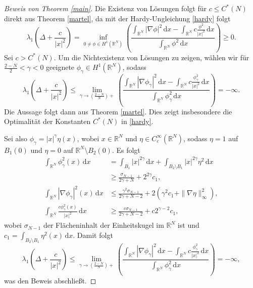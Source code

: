 \documentclass[11pt,twoside,a4paper]{article}
\theoremstyle{break}
\begin{document}
\begin{proof}[Beweis von Theorem \ref{main}]
Die Existenz von Lösungen folgt für $c\le C^*(N)$ direkt aus Theorem \ref{martel}, da mit der Hardy-Ungleichung \eqref{hardy} folgt
\begin{equation}
\lambda_1(\Delta + \frac{c}{|x|^2})= \inf_{0\neq \phi \in H^1(\mathbb R^N)} \left ( \frac{\int_{\mathbb R^N} |\nabla \phi|^2 \, \mathrm dx - \int_{\mathbb R^N} c \frac{\phi^2}{|x|^2}\, \mathrm dx}{\int_{\mathbb R^N}\phi^2\, \mathrm dx} \right )\ge 0.
\end{equation}
Sei $c>C^*(N)$. Um die Nichtexistenz von Lösungen zu zeigen, wählen wir für $\frac{2-N}{2}<\gamma <0$ geeignete $\phi_\gamma\in H^1(\mathbb R^N)$, sodass
\begin{equation}
\lambda_1(\Delta + \frac{c}{|x|^2})\le \lim_{\gamma \to (\tfrac{2-N}{N})+} \left ( \frac{\int_{\mathbb R^N} |\nabla \phi_\gamma|^2\, \mathrm dx- \int_{\mathbb R^N} c \frac{\phi^2_{\gamma}}{|x|^2}\, \mathrm dx}{\int_{\mathbb R^N} \phi^2_\gamma  \, \mathrm dx} \right )=-\infty.
\end{equation}
Die Aussage folgt dann aus Theorem \ref{martel}. Dies zeigt insbesondere die Optimalität der Konstanten $C^*(N)$ in \eqref{hardy}.

Sei also $\phi_\gamma= |x|^\gamma \eta(x)$, wobei $x\in \mathbb R^N$ und $\eta\in C_c^\infty(\mathbb R^N)$, sodass $\eta =1$ auf $B_1(0)$ und $\eta=0$ auf $\mathbb R^N\setminus B_2(0)$.  Es folgt
\begin{align*}
\int_{\mathbb R^N} \phi^2_\gamma(x)\, \mathrm dx &= \int_{B_1} |x|^{2\gamma} \, \mathrm dx + \int_{B_2\setminus B_1} |x|^{2\gamma} \eta^2\, \mathrm dx\\
&\ge \frac{\sigma_{N-1}}{2\gamma+N} + 2^{2\gamma} c_1,\\
\int_{\mathbb R^N} |\nabla \phi_\gamma|^2(x)\, \mathrm dx &\le \frac{\gamma^2 \sigma_{N-1}}{2\gamma +N-2}+ 2(\gamma^2 c_1+ \| \nabla \eta\|^2_\infty),\\
\int_{\mathbb R^N} \frac{c\phi_\gamma^2(x)}{|x|^2} \, \mathrm dx &\ge \frac{c\sigma_{N-1}}{2\gamma+N-2} + c 2^{\gamma -2}c_1,
\end{align*}
wobei $\sigma_{N-1}$ der Flächeninhalt der Einheitskugel im $\mathbb R^N$ ist und $c_1=\int_{B_2 \setminus B_1} \eta^2(x)\, \mathrm dx$. Damit folgt
\begin{equation}
\lambda_1(\Delta + \frac{c}{|x|^2}) \le \lim_{\gamma \to (\tfrac{2-N}{N})+} \left ( \frac{\int_{\mathbb R^N} |\nabla \phi_\gamma|^2\, \mathrm dx- \int_{\mathbb R^N} c \frac{\phi^2_{\gamma}}{|x|^2}\, \mathrm dx}{\int_{\mathbb R^N} \phi^2_\gamma  \, \mathrm dx} \right )=-\infty,
\end{equation}
was den Beweis abschließt.


\end{proof}
\end{document}
